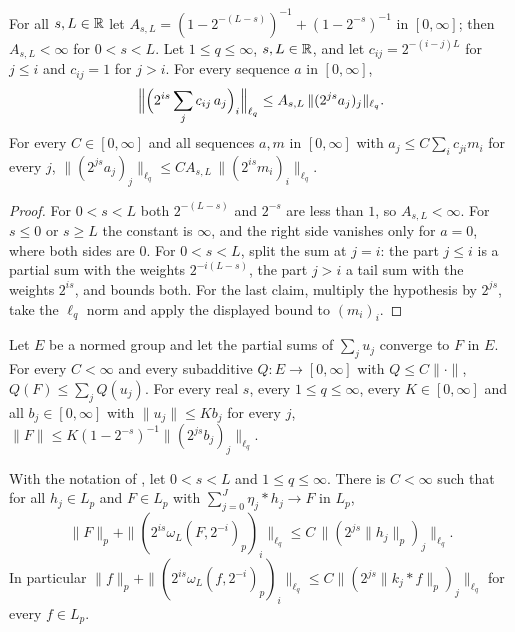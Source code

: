 \begin{lemma}
\label{lem:almost-diagonal}
\leanok
{}
For all $s, L \in \mathbb{R}$ let $A_{s,L} = (1 - 2^{-(L-s)})^{-1} + (1 - 2^{-s})^{-1}$ in $[0, \infty]$;
then $A_{s,L} < \infty$ for $0 < s < L$. Let $1 \leq q \leq \infty$, $s, L \in \mathbb{R}$, and let
$c_{ij} = 2^{-(i-j)L}$ for $j \leq i$ and $c_{ij} = 1$ for $j > i$. For every sequence $a$ in
$[0, \infty]$,
\[
  \Bigl\| \Bigl( 2^{is} \sum_j c_{ij} \, a_j \Bigr)_i \Bigr\|_{\ell_q}
  \leq A_{s,L} \, \|(2^{js} a_j)_j\|_{\ell_q} .
\]
For every $C \in [0, \infty]$ and all sequences $a, m$ in $[0, \infty]$ with
$a_j \leq C \sum_i c_{ji} m_i$ for every $j$,
$\|(2^{js} a_j)_j\|_{\ell_q} \leq C A_{s,L} \, \|(2^{is} m_i)_i\|_{\ell_q}$.
\end{lemma}

\begin{proof}
\leanok
For $0 < s < L$ both $2^{-(L-s)}$ and $2^{-s}$ are less than $1$, so $A_{s,L} < \infty$. For
$s \leq 0$ or $s \geq L$ the constant is $\infty$, and the right side vanishes only for
$a = 0$, where both sides are $0$. For $0 < s < L$, split the sum at $j = i$: the part
$j \leq i$ is a partial sum with the weights $2^{-i(L-s)}$, the part $j > i$ a tail sum with the
weights $2^{is}$, and  bounds both. For the last claim, multiply the hypothesis
by $2^{js}$, take the $\ell_q$ norm and apply the displayed bound to $(m_i)_i$.
\end{proof}

\begin{lemma}
\label{lem:local-means-synthesis}
\leanok
{}
Let $E$ be a normed group and let the partial sums of $\sum_j u_j$ converge to $F$ in $E$. For
every $C < \infty$ and every subadditive $Q \colon E \to [0, \infty]$ with $Q \leq C \|\cdot\|$,
$Q(F) \leq \sum_j Q(u_j)$. For every real $s$, every $1 \leq q \leq \infty$, every
$K \in [0, \infty]$ and all $b_j \in [0, \infty]$ with $\|u_j\| \leq K b_j$ for every $j$,
$\|F\| \leq K (1 - 2^{-s})^{-1} \|(2^{js} b_j)_j\|_{\ell_q}$.

With the notation of , let $0 < s < L$ and $1 \leq q \leq \infty$. There is
$C < \infty$ such that for all $h_j \in L_p$ and $F \in L_p$ with
$\sum_{j=0}^J \eta_j * h_j \to F$ in $L_p$,
\[
  \|F\|_p + \|(2^{is} \omega_L(F, 2^{-i})_p)_i\|_{\ell_q}
  \leq C \, \|(2^{js} \|h_j\|_p)_j\|_{\ell_q} .
\]
In particular $\|f\|_p + \|(2^{is} \omega_L(f, 2^{-i})_p)_i\|_{\ell_q}
\leq C \|(2^{js} \|k_j * f\|_p)_j\|_{\ell_q}$ for every $f \in L_p$.
\end{lemma}

